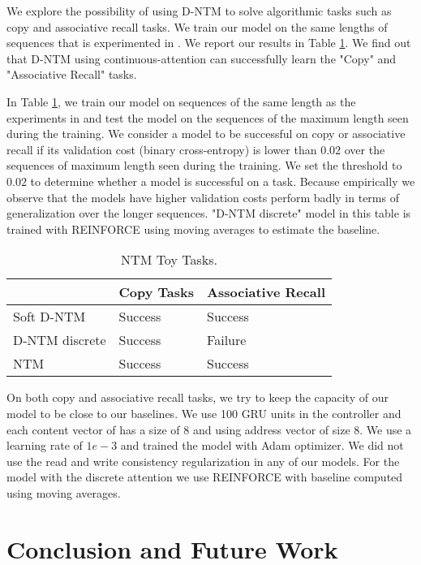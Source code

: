 \documentclass[12pt]{article}
\begin{document}
We explore the possibility of using D-NTM to solve algorithmic tasks such as copy and associative recall tasks. We train our model on the same lengths of sequences that is experimented in \citep{graves2014neural}. We report our results in Table \ref{tbl:ntm_toy_tasks}. We find out that D-NTM using continuous-attention can successfully learn the "Copy" and "Associative Recall" tasks.

In Table \ref{tbl:ntm_toy_tasks}, we train our model on sequences of the same length as the experiments in \citep{graves2014neural} and test the model on the sequences of the maximum length seen during the training. We consider a model to be successful on copy or associative recall if its validation cost (binary cross-entropy) is lower than $0.02$ over the sequences of maximum length seen during the training. We set the threshold to $0.02$ to determine whether a model is successful on a task. Because empirically we observe that the models have higher validation costs perform badly in terms of generalization over the longer sequences. "D-NTM discrete" model in this table is trained with REINFORCE using moving averages to estimate the baseline.

\begin{table}[ht!]

\centering
\footnotesize
\begin{tabular}{@{}lll@{}}
\toprule
           & Copy Tasks & Associative Recall \\ \midrule
Soft D-NTM & Success    & Success            \\
D-NTM discrete & Success    & Failure            \\
NTM        & Success     & Success            \\ \bottomrule
\end{tabular}
\caption{NTM Toy Tasks.}
\label{tbl:ntm_toy_tasks}
\end{table}

On both copy and associative recall tasks, we try to keep the capacity of our model to be close to our baselines. We use 100 GRU units in the controller and each content vector of has a size of 8 and using  address vector of size 8. We use a learning rate of $1e-3$ and trained the model with Adam optimizer. We did not use the read and write consistency regularization in any of our models. For the model with the discrete attention we use REINFORCE with baseline computed using moving averages.

\section{Conclusion and Future Work}
\end{document}
